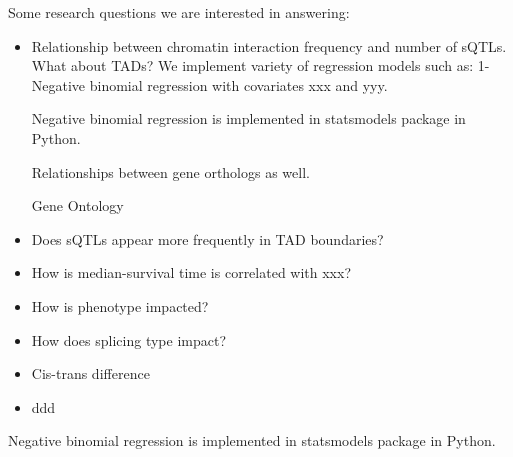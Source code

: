 \documentclass[11pt]{article}
\begin{document}
Some research questions we are interested in answering:

\begin{itemize}
\item Relationship between chromatin interaction frequency and number of sQTLs.
  What about TADs? We implement variety of regression models such as:
1- Negative binomial regression with covariates xxx and yyy.

  Negative binomial regression is implemented in statsmodels package in
Python.

Relationships between gene orthologs as well.

Gene Ontology

 \vspace{0.1cm}
\item Does sQTLs appear more frequently in TAD boundaries?
\vspace{0.1cm}
\item How is median-survival time is correlated with xxx?
\vspace{0.1cm}
\item How is phenotype impacted?
\vspace{0.1cm}
\item How does splicing type impact?
\vspace{0.1cm}
\item Cis-trans difference
\vspace{0.1cm}
\item ddd
\end{itemize}

Negative binomial regression is implemented in statsmodels package in
Python.




\end{document}
